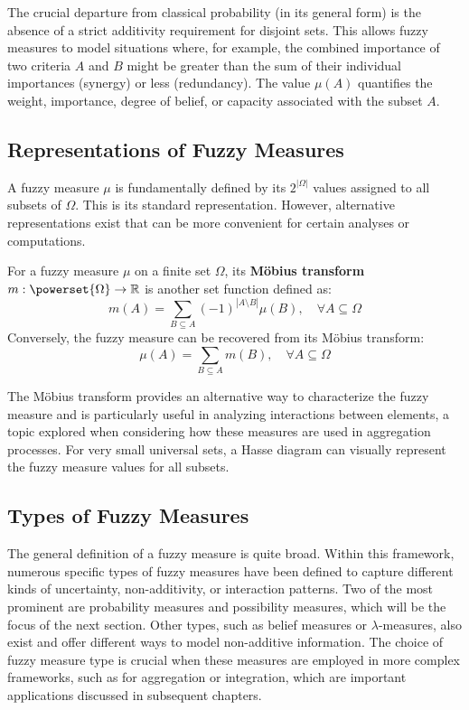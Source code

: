 The crucial departure from classical probability (in its general form) is the absence of a strict additivity requirement for disjoint sets. This allows fuzzy measures to model situations where, for example, the combined importance of two criteria $A$ and $B$ might be greater than the sum of their individual importances (synergy) or less (redundancy). The value $\mu(A)$ quantifies the weight, importance, degree of belief, or capacity associated with the subset $A$.

\subsection{Representations of Fuzzy Measures}
A fuzzy measure $\mu$ is fundamentally defined by its $2^{|\Omega|}$ values assigned to all subsets of $\Omega$. This is its standard representation. However, alternative representations exist that can be more convenient for certain analyses or computations.
\begin{definition}
For a fuzzy measure $\mu$ on a finite set $\Omega$, its \textbf{Möbius transform} $m: \powerset{\Omega} \to \mathbb{R}$ is another set function defined as:
\[ m(A) = \sum_{B \subseteq A} (-1)^{|A \setminus B|} \mu(B), \quad \forall A \subseteq \Omega \]
Conversely, the fuzzy measure can be recovered from its Möbius transform:
\[ \mu(A) = \sum_{B \subseteq A} m(B), \quad \forall A \subseteq \Omega \]
\end{definition}
The Möbius transform provides an alternative way to characterize the fuzzy measure and is particularly useful in analyzing interactions between elements, a topic explored when considering how these measures are used in aggregation processes. For very small universal sets, a Hasse diagram can visually represent the fuzzy measure values for all subsets.

\subsection{Types of Fuzzy Measures}
The general definition of a fuzzy measure is quite broad. Within this framework, numerous specific types of fuzzy measures have been defined to capture different kinds of uncertainty, non-additivity, or interaction patterns. Two of the most prominent are probability measures and possibility measures, which will be the focus of the next section. Other types, such as belief measures or $\lambda$-measures, also exist and offer different ways to model non-additive information. The choice of fuzzy measure type is crucial when these measures are employed in more complex frameworks, such as for aggregation or integration, which are important applications discussed in subsequent chapters.

